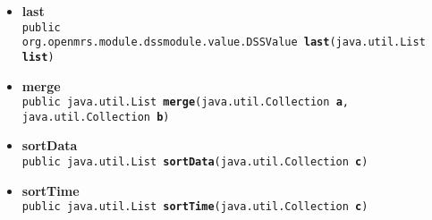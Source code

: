 {{{{{{{{{{{{{{{{{{{\begin{itemize}
{\begin{itemize}
{Utility method to get a DSSValue from a list, with bounds checking. Defaults to DSS null when out of bounds. Note that this is not actual public API; however, it cannot be private without blocking access to the intrinsic functions that AnnotatedDSSLibrary generates.
}
\item{
{\bf  Parameters}
  \begin{itemize}
   \item{
\texttt{list} -- }
   \item{
\texttt{index} -- }
  \end{itemize}
}%
\item{{\bf  Returns} -- 
 
}%
\end{itemize}
}%
\item{ 
\hypertarget{org.openmrs.module.dssmodule.intrinsics.ListLibrary.last(java.util.List)}{{\bf  last}\\}
\texttt{public org.openmrs.module.dssmodule.value.DSSValue\ {\bf  last}(\texttt{java.util.List} {\bf  list})
\label{org.openmrs.module.dssmodule.intrinsics.ListLibrary.last(java.util.List)}}%
}%
\item{ 
\hypertarget{org.openmrs.module.dssmodule.intrinsics.ListLibrary.merge(java.util.Collection, java.util.Collection)}{{\bf  merge}\\}
\texttt{public java.util.List\ {\bf  merge}(\texttt{java.util.Collection} {\bf  a},
\texttt{java.util.Collection} {\bf  b})
\label{org.openmrs.module.dssmodule.intrinsics.ListLibrary.merge(java.util.Collection, java.util.Collection)}}%
}%
\item{ 
\hypertarget{org.openmrs.module.dssmodule.intrinsics.ListLibrary.sortData(java.util.Collection)}{{\bf  sortData}\\}
\texttt{public java.util.List\ {\bf  sortData}(\texttt{java.util.Collection} {\bf  c})
\label{org.openmrs.module.dssmodule.intrinsics.ListLibrary.sortData(java.util.Collection)}}%
}%
\item{ 
\hypertarget{org.openmrs.module.dssmodule.intrinsics.ListLibrary.sortTime(java.util.Collection)}{{\bf  sortTime}\\}
\texttt{public java.util.List\ {\bf  sortTime}(\texttt{java.util.Collection} {\bf  c})
\label{org.openmrs.module.dssmodule.intrinsics.ListLibrary.sortTime(java.util.Collection)}}%
}%
\end{itemize}
}
}}}}}}}}}}}}}}}}}}
